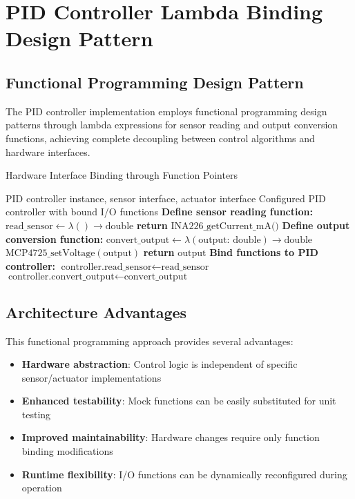 \documentclass{article}
\begin{document}
\section{PID Controller Lambda Binding Design Pattern}

\subsection{Functional Programming Design Pattern}

The PID controller implementation employs functional programming design patterns through lambda expressions for sensor reading and output conversion functions, achieving complete decoupling between control algorithms and hardware interfaces.

\begin{algorithm}
\caption{Hardware Interface Binding through Function Pointers}
\label{alg:function_binding}
\begin{algorithmic}[1]
\REQUIRE PID controller instance, sensor interface, actuator interface
\ENSURE Configured PID controller with bound I/O functions
\STATE \textbf{Define sensor reading function:}
\STATE $\text{read\_sensor} \leftarrow \lambda() \rightarrow \text{double}$
\STATE \quad \textbf{return} $\text{INA226\_getCurrent\_mA()}$
\STATE
\STATE \textbf{Define output conversion function:}
\STATE $\text{convert\_output} \leftarrow \lambda(\text{output: double}) \rightarrow \text{double}$
\STATE \quad $\text{MCP4725\_setVoltage}(\text{output})$
\STATE \quad \textbf{return} $\text{output}$
\STATE
\STATE \textbf{Bind functions to PID controller:}
\STATE $\text{controller.read\_sensor} \leftarrow \text{read\_sensor}$
\STATE $\text{controller.convert\_output} \leftarrow \text{convert\_output}$
\end{algorithmic}
\end{algorithm}

\subsection{Architecture Advantages}

This functional programming approach provides several advantages:
\begin{itemize}
    \item \textbf{Hardware abstraction}: Control logic is independent of specific sensor/actuator implementations
    \item \textbf{Enhanced testability}: Mock functions can be easily substituted for unit testing
    \item \textbf{Improved maintainability}: Hardware changes require only function binding modifications
    \item \textbf{Runtime flexibility}: I/O functions can be dynamically reconfigured during operation
\end{itemize}
\end{document}
